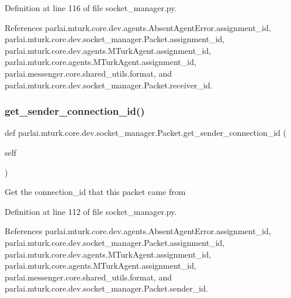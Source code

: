 Definition at line 116 of file socket\+\_\+manager.\+py.



References parlai.\+mturk.\+core.\+dev.\+agents.\+Absent\+Agent\+Error.\+assignment\+\_\+id, parlai.\+mturk.\+core.\+dev.\+socket\+\_\+manager.\+Packet.\+assignment\+\_\+id, parlai.\+mturk.\+core.\+dev.\+agents.\+M\+Turk\+Agent.\+assignment\+\_\+id, parlai.\+mturk.\+core.\+agents.\+M\+Turk\+Agent.\+assignment\+\_\+id, parlai.\+messenger.\+core.\+shared\+\_\+utils.\+format, and parlai.\+mturk.\+core.\+dev.\+socket\+\_\+manager.\+Packet.\+receiver\+\_\+id.

\mbox{\label{classparlai_1_1mturk_1_1core_1_1dev_1_1socket__manager_1_1Packet_a65f708d63e94b812df966323c6c4e4b1}} 
\subsubsection{\texorpdfstring{get\+\_\+sender\+\_\+connection\+\_\+id()}{get\_sender\_connection\_id()}}
{\footnotesize\ttfamily def parlai.\+mturk.\+core.\+dev.\+socket\+\_\+manager.\+Packet.\+get\+\_\+sender\+\_\+connection\+\_\+id (\begin{DoxyParamCaption}\item[{}]{self }\end{DoxyParamCaption})}

\begin{DoxyVerb}Get the connection_id that this packet came from\end{DoxyVerb}
 

Definition at line 112 of file socket\+\_\+manager.\+py.



References parlai.\+mturk.\+core.\+dev.\+agents.\+Absent\+Agent\+Error.\+assignment\+\_\+id, parlai.\+mturk.\+core.\+dev.\+socket\+\_\+manager.\+Packet.\+assignment\+\_\+id, parlai.\+mturk.\+core.\+dev.\+agents.\+M\+Turk\+Agent.\+assignment\+\_\+id, parlai.\+mturk.\+core.\+agents.\+M\+Turk\+Agent.\+assignment\+\_\+id, parlai.\+messenger.\+core.\+shared\+\_\+utils.\+format, and parlai.\+mturk.\+core.\+dev.\+socket\+\_\+manager.\+Packet.\+sender\+\_\+id.

